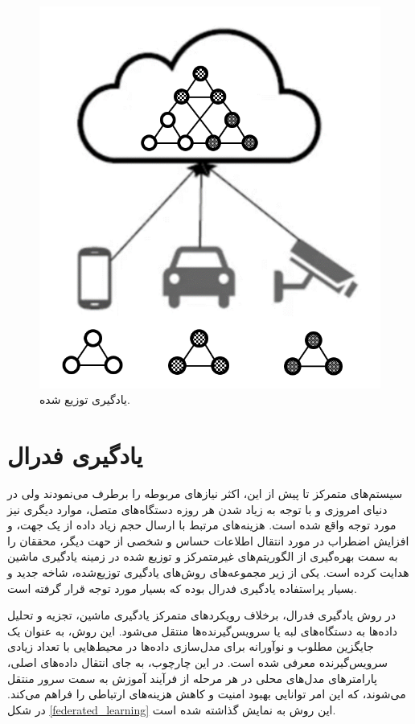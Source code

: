 \begin{figure}[t]
	\centering
	\includegraphics[scale=0.35]{images/chap1/distributed_learning.png}%
	\caption{%
		یادگیری توزیع شده.
	}
	\label{distributed_learning}
	\centering
\end{figure}

\section{یادگیری فدرال}
سیستم‌های متمرکز تا پیش از این، اکثر نیازهای مربوطه را برطرف می‌نمودند ولی در دنیای امروزی و با توجه به زیاد شدن هر روزه دستگاه‌های متصل، موارد دیگری نیز مورد توجه واقع شده است.
هزینه‌های مرتبط با ارسال حجم زیاد داده از یک جهت، و افزایش اضطراب در مورد انتقال اطلاعات حساس و شخصی از حهت دیگر، محققان را به سمت بهره‌گیری از الگوریتم‌های غیرمتمرکز و توزیع شده در زمینه یادگیری ماشین هدایت کرده است.
یکی از زیر مجموعه‌های روش‌های یادگیری توزیع‌شده، شاخه جدید و بسیار پراستفاده یادگیری فدرال بوده که بسیار مورد توجه قرار گرفته است.

در روش یادگیری فدرال، برخلاف رویکردهای متمرکز یادگیری ماشین، تجزیه و تحلیل داده‌ها به دستگاه‌های لبه%
یا سرویس‌گیرنده‌ها%
منتقل می‌شود. این روش، به عنوان یک جایگزین مطلوب و نوآورانه برای مدل‌سازی داده‌ها در محیط‌هایی با تعداد زیادی سرویس‌گیرنده معرفی شده است. در این چارچوب، به جای انتقال داده‌های اصلی، پارامترهای مدل‌های محلی در هر مرحله از فرآیند آموزش به سمت سرور منتقل می‌شوند، که این امر توانایی بهبود امنیت و کاهش هزینه‌های ارتباطی را فراهم می‌کند.
در شکل
\ref{federated_learning}
این روش به نمایش گذاشته شده است.


